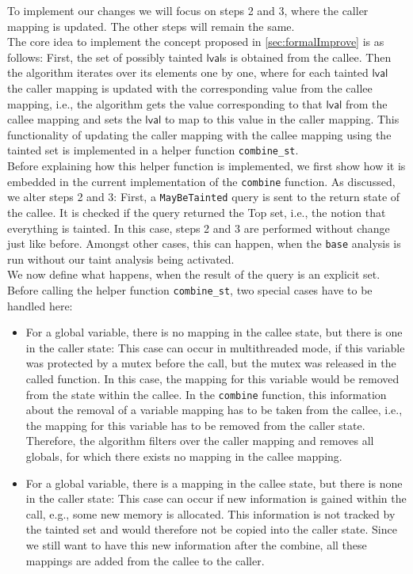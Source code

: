       To implement our changes we will focus on steps 2 and 3, where the caller mapping is updated. The other steps will remain the same.\\
      The core idea to implement the concept proposed in \autoref{sec:formalImprove} is as follows: First, the set of possibly tainted $\textsf{lval}$s is obtained from the callee. Then the algorithm iterates over its elements one by one, where for each tainted $\textsf{lval}$ the caller mapping is updated with the corresponding value from the callee mapping, i.e., the algorithm gets the value corresponding to that $\textsf{lval}$ from the callee mapping and sets the $\textsf{lval}$ to map to this value in the caller mapping. This functionality of updating the caller mapping with the callee mapping using the tainted set is implemented in a helper function \texttt{combine\_st}.\\
      Before explaining how this helper function is implemented, we first show how it is embedded in the current implementation of the \texttt{combine} function. As discussed, we alter steps 2 and 3: First, a \texttt{MayBeTainted} query is sent to the return state of the callee. It is checked if the query returned the Top set, i.e., the notion that everything is tainted. In this case, steps 2 and 3 are performed without change just like before. Amongst other cases, this can happen, when the \texttt{base} analysis is run without our taint analysis being activated.\\
      We now define what happens, when the result of the query is an explicit set. Before calling the helper function \texttt{combine\_st}, two special cases have to be handled here:
      \begin{itemize}
        \item For a global variable, there is no mapping in the callee state, but there is one in the caller state: This case can occur in multithreaded mode, if this variable was protected by a mutex before the call, but the mutex was released in the called function. In this case, the mapping for this variable would be removed from the state within the callee. In the \texttt{combine} function, this information about the removal of a variable mapping has to be taken from the callee, i.e., the mapping for this variable has to be removed from the caller state. Therefore, the algorithm filters over the caller mapping and removes all globals, for which there exists no mapping in the callee mapping.

        \item For a global variable, there is a mapping in the callee state, but there is none in the caller state: This case can occur if new information is gained within the call, e.g., some new memory is allocated. This information is not tracked by the tainted set and would therefore not be copied into the caller state. Since we still want to have this new information after the combine, all these mappings are added from the callee to the caller.
      \end{itemize}
